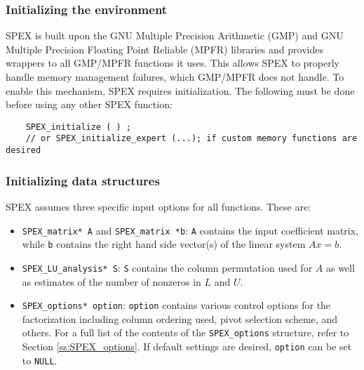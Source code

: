 \documentclass[12pt]{report}
\theoremstyle{definition}
\begin{document}
\subsubsection{Initializing the environment}

SPEX is built upon the GNU Multiple Precision Arithmetic (GMP)
\cite{granlund2015gnu} and GNU Multiple Precision Floating Point Reliable
(MPFR) \cite{fousse2007mpfr} libraries and provides wrappers to all GMP/MPFR
functions it uses.  This allows SPEX to properly handle memory management
failures, which GMP/MPFR does not handle.  To enable this mechanism, SPEX
requires initialization.  The following must be done before using any other
SPEX function:

\begin{mdframed}[userdefinedwidth=6in]
{\footnotesize
\begin{verbatim}
    SPEX_initialize ( ) ;
    // or SPEX_initialize_expert (...); if custom memory functions are desired
\end{verbatim}
} \end{mdframed}

\subsubsection{Initializing data structures}
\label{ss:init}

SPEX assumes three specific input options for all functions. These are:

\begin{itemize}
\item \verb|SPEX_matrix* A| and \verb|SPEX_matrix *b|: \verb|A| contains the
input coefficient matrix, while \verb|b| contains the right hand side vector(s)
of the linear system $Ax=b$.

\item \verb|SPEX_LU_analysis* S|: \verb|S| contains the column permutation used
for $A$ as well as estimates of the number of nonzeros in $L$ and $U$.

\item \verb|SPEX_options* option|: \verb|option| contains various control
options for the factorization including column ordering used, pivot selection
scheme, and others. For a full list of the contents of the \verb|SPEX_options|
structure, refer to Section \ref{ss:SPEX_options}.
If default settings are desired, \verb|option| can be set to \verb|NULL|.

\end{itemize}
\end{document}
